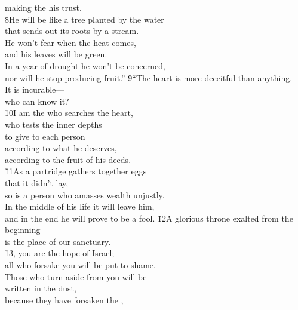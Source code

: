 \begin{poetry}
\poemll    making the  his trust. \\
\poeml \v{8}He will be like a tree planted by the water \\
\poemll    that sends out its roots by a stream. \\
\poeml He won't fear when the heat comes, \\
\poemll    and his leaves will be green. \\
\poeml In a year of drought he won't be concerned, \\
\poemll    nor will he stop producing fruit.''
\poeml \v{9}``The heart is more deceitful than anything. \\
\poemll    It is incurable--- \\
\poemlll       who can know it? \\
\poeml \v{10}I am the  who searches the heart, \\
\poemll    who tests the inner depths \\
\poeml to give to each person \\
\poemll    according to what he deserves, \\
\poemlll       according to the fruit of his deeds. \\
\poeml \v{11}As a partridge gathers together eggs \\
\poemll    that it didn't lay, \\
\poeml so is a person who amasses wealth unjustly. \\
\poemll    In the middle of his life it will leave him, \\
\poemlll       and in the end he will prove to be a fool.
\poeml \v{12}A glorious throne exalted from the beginning \\
\poemll    is the place of our sanctuary. \\
\poeml \v{13}, you are the hope of Israel; \\
\poemll    all who forsake you will be put to shame. \\
\poeml Those who turn aside from you will be \\
\poemll    written in the dust, \\
\poeml because they have forsaken the , \\

\end{poetry}
